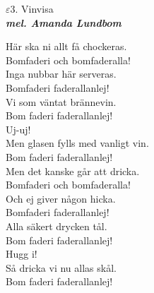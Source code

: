 \documentclass[a6paper,10pt]{article}
\newcommand{\mel}[1]{\small\textbf{\textit{mel. #1 \\}}}
\begin{document}
\setlength{\oddsidemargin}{-0.37in}
\noindent
\begin{center}
\Large $\varepsilon3$. Vinvisa \\ 
\mel{Amanda Lundbom}
\end{center}
Här ska ni allt få chockeras.\\
Bomfaderi och bomfaderalla!\\
Inga nubbar här serveras.\\
Bomfaderi faderallanlej!
\vspace{5pt}\\
Vi som väntat brännevin.\\
Bom faderi faderallanlej!\\
Uj-uj!\\
Men glasen fylls med vanligt vin.\\
Bom faderi faderallanlej!
\vspace{5pt}\\
Men det kanske går att dricka.\\
Bomfaderi och bomfaderalla!\\
Och ej giver någon hicka.\\
Bomfaderi faderallanlej!
\vspace{5pt}\\
Alla säkert drycken tål.\\
Bom faderi faderallanlej!\\
Hugg i!\\
Så dricka vi nu allas skål.\\
Bom faderi faderallanlej!
\end{document}
